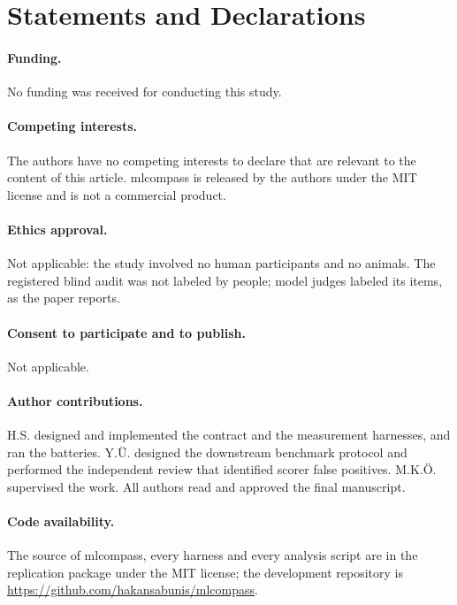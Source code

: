 \documentclass[10pt,twocolumn]{article}
\begin{document}
\section*{Statements and Declarations}
\paragraph{Funding.} No funding was received for conducting this study.

\paragraph{Competing interests.} The authors have no competing interests to
declare that are relevant to the content of this article. mlcompass is released
by the authors under the MIT license and is not a commercial product.

\paragraph{Ethics approval.} Not applicable: the study involved no human
participants and no animals. The registered blind audit was not labeled by
people; model judges labeled its items, as the paper reports.

\paragraph{Consent to participate and to publish.} Not applicable.

\paragraph{Author contributions.} H.S. designed and implemented the contract
and the measurement harnesses, and ran the batteries. Y.\"U. designed the
downstream benchmark protocol and performed the independent review that
identified scorer false positives. M.K.\"O. supervised the work. All authors
read and approved the final manuscript.

\paragraph{Code availability.} The source of mlcompass, every harness and every
analysis script are in the replication package \citep{replication} under the
MIT license; the development repository is
\url{https://github.com/hakansabunis/mlcompass}.




\end{document}
